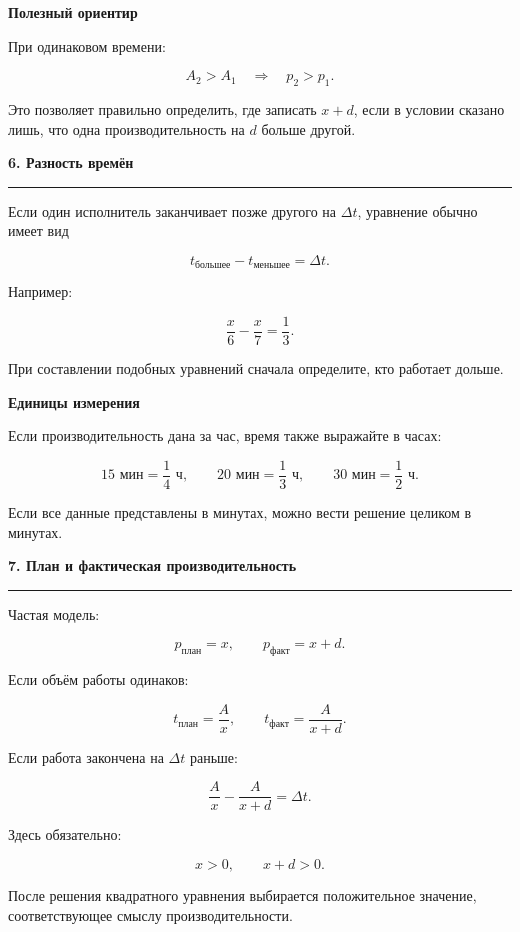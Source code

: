 \documentclass[a4paper,12pt]{article}
\newcommand{\topic}[1]{%
    \vspace{0.5em}
    {\Large\bfseries\color{darkaccent}#1}\par
    \vspace{0.25em}
    {\color{accent!55}\rule{\linewidth}{0.6pt}}\par
    \vspace{0.45em}
}
\newcommand{\subtopic}[1]{%
    \vspace{0.4em}
    {\large\bfseries\color{darkaccent}#1}\par
    \vspace{0.15em}
}
\begin{document}
\subtopic{Полезный ориентир}

При одинаковом времени:

\[
A_2>A_1
\quad\Longrightarrow\quad
p_2>p_1.
\]

Это позволяет правильно определить, где записать $x+d$, если в условии сказано лишь, что одна производительность на $d$ больше другой.


\topic{6. Разность времён}

Если один исполнитель заканчивает позже другого на $\Delta t$, уравнение обычно имеет вид

\[
\boxed{t_{\text{большее}}-t_{\text{меньшее}}=\Delta t}.
\]

Например:

\[
\frac{x}{6}-\frac{x}{7}=\frac13.
\]

При составлении подобных уравнений сначала определите, кто работает дольше.

\subtopic{Единицы измерения}

Если производительность дана за час, время также выражайте в часах:

\[
15\text{ мин}=\frac14\text{ ч},
\qquad
20\text{ мин}=\frac13\text{ ч},
\qquad
30\text{ мин}=\frac12\text{ ч}.
\]

Если все данные представлены в минутах, можно вести решение целиком в минутах.


\topic{7. План и фактическая производительность}

Частая модель:

\[
p_{\text{план}}=x,
\qquad
p_{\text{факт}}=x+d.
\]

Если объём работы одинаков:

\[
t_{\text{план}}=\frac{A}{x},
\qquad
t_{\text{факт}}=\frac{A}{x+d}.
\]

Если работа закончена на $\Delta t$ раньше:

\[
\boxed{
\frac{A}{x}-\frac{A}{x+d}=\Delta t
}.
\]

Здесь обязательно:

\[
x>0,
\qquad
x+d>0.
\]

После решения квадратного уравнения выбирается положительное значение, соответствующее смыслу производительности.

\end{document}
